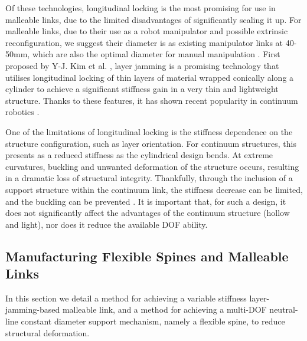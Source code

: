 Of these technologies, longitudinal locking is the most promising for use in malleable links, due to the limited disadvantages of significantly scaling it up. For malleable links, due to their use as a robot manipulator and possible extrinsic reconfiguration, we suggest their diameter is as existing manipulator links at 40-50mm, which are also the optimal diameter for manual manipulation \cite{mcdowell2012effects}. First proposed by Y-J. Kim et al. \cite{kim2012design}, layer jamming is a promising technology that utilises longitudinal locking of thin layers of material wrapped conically along a cylinder to achieve a significant stiffness gain in a very thin and lightweight structure. Thanks to these features, it has shown recent popularity in continuum robotics \cite{ yoon2009flexible, mehling2006minimally, blessing2004novel, kim2013stiffness, santiago2015continuum, langer2018stiffening}.

One of the limitations of longitudinal locking is the stiffness dependence on the structure configuration, such as layer orientation. For continuum structures, this presents as a reduced stiffness as the cylindrical design bends. At extreme curvatures, buckling and unwanted deformation of the structure occurs, resulting in a dramatic loss of structural integrity. Thankfully, through the inclusion of a support structure within the continuum link, the stiffness decrease can be limited, and the buckling can be prevented \cite{clark2019stiffness}. It is important that, for such a design, it does not significantly affect the advantages of the continuum structure (hollow and light), nor does it reduce the available DOF ability.

\subsection{Manufacturing Flexible Spines and Malleable Links}

In this section we detail a method for achieving a variable stiffness layer-jamming-based malleable link, and a method for achieving a multi-DOF neutral-line constant diameter support mechanism, namely a flexible spine, to reduce structural deformation.

